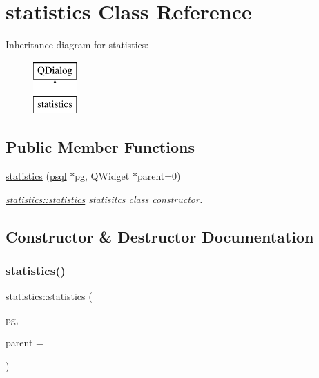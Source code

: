 \hypertarget{classstatistics}{}\section{statistics Class Reference}
\label{classstatistics}
Inheritance diagram for statistics\+:\begin{figure}[H]
\begin{center}
\leavevmode
\includegraphics[height=2.000000cm]{classstatistics}
\end{center}
\end{figure}
\subsection*{Public Member Functions}
\begin{DoxyCompactItemize}
\item 
\mbox{\hyperlink{classstatistics_aaa102e49836a3b719df3a82e28735adc}{statistics}} (\mbox{\hyperlink{classpsql}{psql}} $\ast$pg, Q\+Widget $\ast$parent=0)
\begin{DoxyCompactList}\small\item\em \mbox{\hyperlink{classstatistics_aaa102e49836a3b719df3a82e28735adc}{statistics\+::statistics}} statisitcs class constructor. \end{DoxyCompactList}\end{DoxyCompactItemize}


\subsection{Constructor \& Destructor Documentation}
\mbox{\label{classstatistics_aaa102e49836a3b719df3a82e28735adc}} 
\subsubsection{\texorpdfstring{statistics()}{statistics()}}
{\footnotesize\ttfamily statistics\+::statistics (\begin{DoxyParamCaption}\item[{\mbox{\hyperlink{classpsql}{psql}} $\ast$}]{pg,  }\item[{Q\+Widget $\ast$}]{parent = {} }\end{DoxyParamCaption})\hspace{0.3cm}{\ttfamily [explicit]}}



